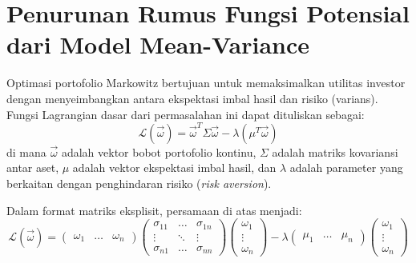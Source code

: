 \chapter{Penurunan Rumus Fungsi Potensial dari Model Mean-Variance}
\label{appendix:derivation_epg}

Optimasi portofolio Markowitz bertujuan untuk memaksimalkan utilitas investor dengan menyeimbangkan antara ekspektasi imbal hasil dan risiko (varians). Fungsi Lagrangian dasar dari permasalahan ini dapat dituliskan sebagai:
\begin{equation}
    \mathcal{L}(\vec{\omega}) = \vec{\omega}^{T} \Sigma \vec{\omega} - \lambda(\mu^T\vec{\omega})
\end{equation}
di mana $\vec{\omega}$ adalah vektor bobot portofolio kontinu, $\Sigma$ adalah matriks kovariansi antar aset, $\mu$ adalah vektor ekspektasi imbal hasil, dan $\lambda$ adalah parameter yang berkaitan dengan penghindaran risiko (\textit{risk aversion}).

Dalam format matriks eksplisit, persamaan di atas menjadi:
\begin{equation}
    \mathcal{L(\vec{\omega})} = \begin{pmatrix}\omega_1 & \dots & \omega_n\end{pmatrix} 
    \begin{pmatrix}
    \sigma_{11} & \dots & \sigma_{1n} \\ 
    \vdots & \ddots & \vdots \\ 
    \sigma_{n1} & \dots & \sigma_{nn}
    \end{pmatrix} 
    \begin{pmatrix}\omega_1 \\ \vdots \\ \omega_n\end{pmatrix} 
    - \lambda \begin{pmatrix}\mu_1 & \dots & \mu_n\end{pmatrix} 
    \begin{pmatrix}\omega_1 \\ \vdots \\ \omega_n\end{pmatrix}
\end{equation}

